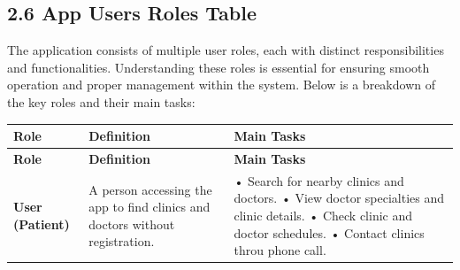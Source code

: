 \documentclass[12pt]{report}
\begin{document}
\newpage
\subsection*{2.6 App Users Roles Table}
\noindent The application consists of multiple user roles, each with distinct responsibilities and functionalities. Understanding these roles is essential for ensuring smooth operation and proper management within the system. Below is a breakdown of the key roles and their main tasks:
\vspace{0.2cm}
\renewcommand{\arraystretch}{1.3} %

\begin{longtable}{|p{3cm}|p{6cm}|p{6cm}|}

	\hline
	\rowcolor[HTML]{C0C0C0}
	\hspace*{1cm}\textbf{Role}                                                                                 & \hspace*{1.9cm} \textbf{Definition}                                                 & \hspace*{1.9cm}\textbf{Main Tasks} \\
	\hline
	\endfirsthead

	\hline
	\rowcolor[HTML]{C0C0C0}
	\hspace*{1cm}\textbf{Role}                                                                                 & \hspace*{1.9cm} \textbf{Definition}                                                 & \hspace*{1.9cm}\textbf{Main Tasks} \\
	\hline
	\endhead

	\hspace*{0.1cm}\textbf{User (Patient)}                                                                     & A person accessing the app to find clinics and doctors without registration.        &
	• Search for nearby clinics and doctors.\newline
	• View doctor specialties and clinic details.\newline
	• Check clinic and doctor schedules.\newline
	• Contact clinics throu phone call.                                                                                                                                                                                                   \\
	\hline


\end{longtable}
\end{document}
